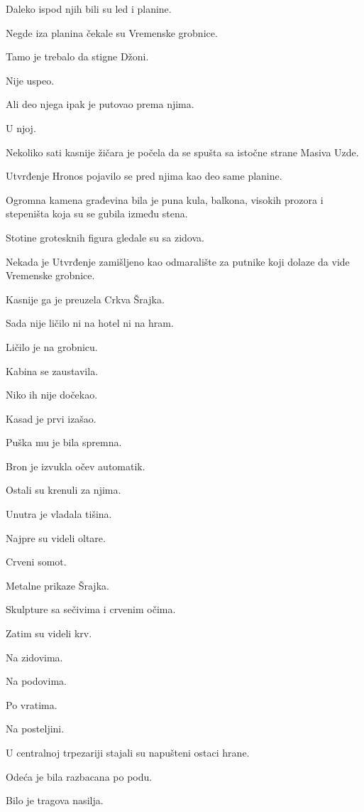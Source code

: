 Daleko ispod njih bili su led i planine.

Negde iza planina čekale su Vremenske grobnice.

Tamo je trebalo da stigne Džoni.

Nije uspeo.

Ali deo njega ipak je putovao prema njima.

U njoj.

\bigskip

Nekoliko sati kasnije žičara je počela da se spušta sa istočne strane Masiva Uzde.

Utvrđenje Hronos pojavilo se pred njima kao deo same planine.

Ogromna kamena građevina bila je puna kula, balkona, visokih prozora i stepeništa koja su se gubila između stena.

Stotine grotesknih figura gledale su sa zidova.

Nekada je Utvrđenje zamišljeno kao odmaralište za putnike koji dolaze da vide Vremenske grobnice.

Kasnije ga je preuzela Crkva Šrajka.

Sada nije ličilo ni na hotel ni na hram.

Ličilo je na grobnicu.

\bigskip

Kabina se zaustavila.

Niko ih nije dočekao.

Kasad je prvi izašao.

Puška mu je bila spremna.

Bron je izvukla očev automatik.

Ostali su krenuli za njima.

Unutra je vladala tišina.

Najpre su videli oltare.

Crveni somot.

Metalne prikaze Šrajka.

Skulpture sa sečivima i crvenim očima.

Zatim su videli krv.

Na zidovima.

Na podovima.

Po vratima.

Na posteljini.

U centralnoj trpezariji stajali su napušteni ostaci hrane.

Odeća je bila razbacana po podu.

Bilo je tragova nasilja.

